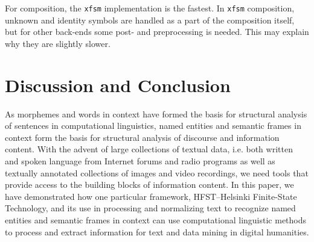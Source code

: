 \documentclass{llncs}
\begin{document}
For composition, the {\tt xfsm} implementation is the fastest. In {\tt xfsm} composition, unknown and identity
symbols are handled as a part of the composition itself, but for other back-ends some post- and preprocessing is
needed. This may  explain why they are slightly slower.

\section{Discussion and Conclusion}\label{sec:discussion}

As morphemes and words in context have formed the basis for structural analysis
of sentences in computational linguistics, named entities and semantic frames in context 
form the basis for structural analysis of discourse and information content. 
With the advent of large collections of textual data, i.e. both written and spoken language from
Internet forums and radio programs as well as textually annotated
collections of images and video recordings, we need tools that provide access to
the building blocks of information content. In this paper, we have demonstrated how one
particular framework, HFST--Helsinki Finite-State Technology, and its
use in processing and normalizing text to recognize named entities and semantic frames in context can
use computational linguistic methods to process and extract information 
for text and data mining in digital humanities.



\end{document}
